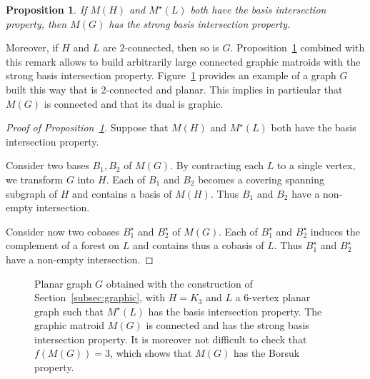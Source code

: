 \documentclass[12pt]{amsart}
\theoremstyle{plain}
\newtheorem{proposition}[theorem]{Proposition}
\theoremstyle{definition}
\theoremstyle{remark}
\begin{document}
\begin{proposition}\label{prop:sbip-graphic}
If $M(H)$ and $M^\star(L)$ both have the basis intersection property, then $M(G)$ has the strong basis intersection property.
\end{proposition}

Moreover, if $H$ and $L$ are $2$-connected, then so is $G$. Proposition~\ref{prop:sbip-graphic} combined with this remark allows to build arbitrarily large connected graphic matroids with the strong basis intersection property. Figure~\ref{fig:graphic} provides an example of a graph $G$ built this way that is $2$-connected and planar. This implies in particular that $M(G)$ is connected and that its dual is graphic.


\begin{proof}[Proof of Proposition~\ref{prop:sbip-graphic}]
Suppose that $M(H)$ and $M^\star(L)$ both have the basis intersection property.

Consider two bases $B_1,B_2$ of $M(G)$. By contracting each $L$ to a single vertex, we transform $G$ into $H$. Each of $B_1$ and $B_2$ becomes a covering spanning subgraph of $H$ and contains a basis of $M(H)$. Thus $B_1$ and $B_2$ have a non-empty intersection.

Consider now two cobases $B_1^\star$ and $B_2^\star$ of $M(G)$. Each of $B_1^\star$ and $B_2^\star$ induces the complement of a forest on $L$ and contains thus a cobasis of $L$. Thus $B_1^\star$ and $B_2^\star$ have a non-empty intersection. 
\end{proof}

\begin{figure}

\caption{Planar graph $G$ obtained with the construction of Section~\ref{subsec:graphic}, with $H=K_3$ and $L$ a $6$-vertex planar graph such that $M^\star(L)$ has the basis intersection property. The graphic matroid $M(G)$ is connected and has the strong basis intersection property. It is moreover not difficult to check that $f(M(G))=3$, which shows that $M(G)$ has the Borsuk property.\label{fig:graphic}}
\end{figure}
\end{document}
